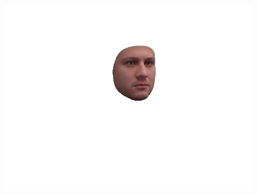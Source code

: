 \begin{figure}[h]
\begin{minipage}{.325\textwidth}
      \includegraphics[width=0.99\textwidth]{Figures/dataset/2D/4.png}
    \end{minipage}


\end{figure}
